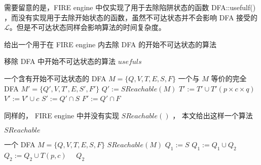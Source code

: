 需要留意的是，FIRE engine 中仅实现了用于去除陷阱状态的函数 DFA::usefulf() ，而没有实现用于去除开始状态的函数，虽然不可达状态并不会影响 DFA 接受的 $\mathcal{L} $。但是不可达状态同样会影响算法的时间复杂度。

给出一个用于在 FIRE engine 内去除 DFA 的开始不可达状态的算法

\begin{algorithm}
    \caption{ 移除 DFA 中开始不可达状态的算法 $usefuls$ }\label{al:usefuls}
    \begin{algorithmic}[1]
        \Require 一个含有开始不可达状态的 DFA $M=\{Q,V,T,E,S,F\}$
        \Ensure 一个与 $M$ 等价的完全 DFA $M'=\{Q',V,T',E,S',F'\}$
        \Statex {}
            \State $Q' := SReachable(M) $
                        \State $ T' := T' \cup T'(p\times c \times q) $
                        \State $ V' := V' \cup c $
                    \EndIf
                \EndFor
            \EndFor
            \State $S':=Q' \cap S$
            \State $F':=Q' \cap F$
        \EndFunction
    \end{algorithmic}
\end{algorithm}

同样的， FIRE engine 中并没有实现 $SReachable()$ ， 本文给出这样一个算法

\begin{algorithm}
    \caption{ $SReachable$ }\label{al:SReachable}
    \small%
    \begin{algorithmic}[1]
        \Require 一个 DFA $M=\{Q,V,T,E,S,F\}$
        \Ensure $SReachable(M)$
        \Statex %
            \State $ Q_1 := S $
            \Repeat
                \State $Q_1 := Q_1 \cup Q_2 $
                            $ Q_2 := Q_2 \cup T(p,c)  $
                        \EndIf
                    \EndFor
                \EndFor
             {~~$Q_2$}
        \EndFunction
    \end{algorithmic}
\end{algorithm}